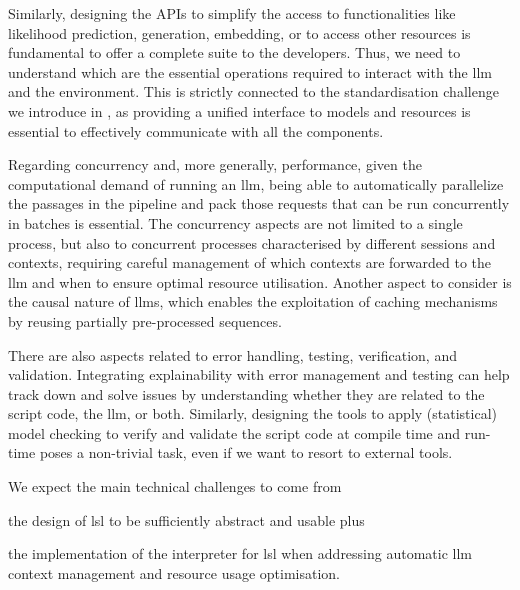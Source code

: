 \documentclass[manuscript,screen]{acmart}
\begin{document}
Similarly, designing the APIs to simplify the access to functionalities like likelihood prediction, generation, embedding, or to access other resources is fundamental to offer a complete suite to the developers.
Thus, we need to understand which are the essential operations required to interact with the \ac{llm} and the environment.
This is strictly connected to the standardisation challenge we introduce in , as providing a unified interface to models and resources is essential to effectively communicate with all the components.

Regarding concurrency and, more generally, performance, given the computational demand of running an \ac{llm}, being able to automatically parallelize the passages in the pipeline and pack those requests that can be run concurrently in batches is essential.
The concurrency aspects are not limited to a single process, but also to concurrent processes characterised by different sessions and contexts, requiring careful management of which contexts are forwarded to the \ac{llm} and when to ensure optimal resource utilisation.
Another aspect to consider is the causal nature of \acp{llm}, which enables the exploitation of caching mechanisms by reusing partially pre-processed sequences.  %

There are also aspects related to error handling, testing, verification, and validation.
Integrating explainability with error management and testing can help track down and solve issues by understanding whether they are related to the script code, the \ac{llm}, or both.
Similarly, designing the tools to apply (statistical) model checking to verify and validate the script code at compile time and run-time poses a non-trivial task, even if we want to resort to external tools.

\begin{tcolorbox}[
    title=Technical barrier, %
    left=1mm,
    right=1mm,
    top=1mm,
    bottom=1mm,
    fonttitle=\bfseries, %
    boxrule=0.5pt, %
    arc=5pt, %
    width=\columnwidth %
]
We expect the main technical challenges to come from
\begin{enumerate*}[label=(\roman*)]
    \item the design of \ac{lsl} to be sufficiently abstract and usable plus
    \item the implementation of the interpreter for \ac{lsl} when addressing automatic \ac{llm} context management and resource usage optimisation.
\end{enumerate*}
\end{tcolorbox}
\end{document}
